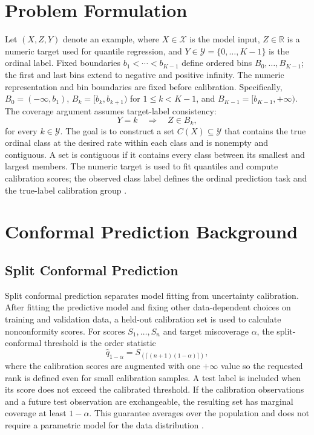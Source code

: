 \documentclass[12pt]{report}
\begin{document}
\section{Problem Formulation}

Let \((X,Z,Y)\) denote an example, where \(X\in\mathcal{X}\) is the model input, \(Z\in\mathbb{R}\) is a numeric target used for quantile regression, and \(Y\in\mathcal{Y}=\{0,\ldots,K-1\}\) is the ordinal label. Fixed boundaries \(b_1<\cdots<b_{K-1}\) define ordered bins \(B_0,\ldots,B_{K-1}\); the first and last bins extend to negative and positive infinity. The numeric representation and bin boundaries are fixed before calibration. Specifically, \(B_0=(-\infty,b_1)\), \(B_k=[b_k,b_{k+1})\) for \(1\leq k<K-1\), and \(B_{K-1}=[b_{K-1},+\infty)\). The coverage argument assumes target-label consistency:
\begin{equation}
Y=k \quad\Longrightarrow\quad Z\in B_k,
\label{eq:ocqr-target-label-consistency}
\end{equation}
for every \(k\in\mathcal{Y}\). The goal is to construct a set \(C(X)\subseteq\mathcal{Y}\) that contains the true ordinal class at the desired rate within each class and is nonempty and contiguous. A set is contiguous if it contains every class between its smallest and largest members. The numeric target is used to fit quantiles and compute calibration scores; the observed class label defines the ordinal prediction task and the true-label calibration group \citep{hong2026ocqr}.

\section{Conformal Prediction Background}

\subsection{Split Conformal Prediction}

Split conformal prediction separates model fitting from uncertainty calibration. After fitting the predictive model and fixing other data-dependent choices on training and validation data, a held-out calibration set is used to calculate nonconformity scores. For scores \(S_1,\ldots,S_n\) and target miscoverage \(\alpha\), the split-conformal threshold is the order statistic
\begin{equation}
\widehat q_{1-\alpha}
=S_{(\lceil(n+1)(1-\alpha)\rceil)},
\label{eq:ocqr-split-threshold}
\end{equation}
where the calibration scores are augmented with one \(+\infty\) value so the requested rank is defined even for small calibration samples. A test label is included when its score does not exceed the calibrated threshold. If the calibration observations and a future test observation are exchangeable, the resulting set has marginal coverage at least \(1-\alpha\). This guarantee averages over the population and does not require a parametric model for the data distribution \citep{vovk1999cp,romano2020classification}.
\end{document}
